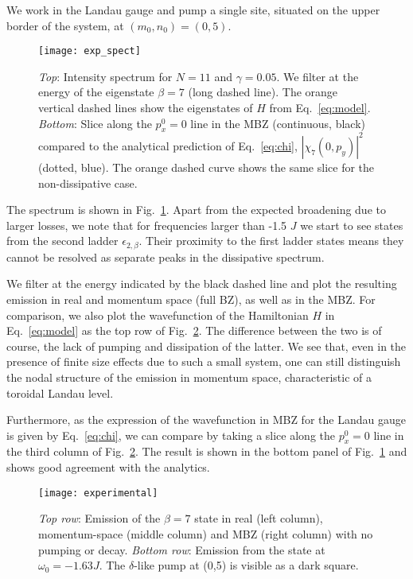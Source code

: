 \documentclass[twocolumn, 10pt, aps, superscriptaddress, floatfix, showpacs, pra, citeautoscript]{revtex4-1}
\begin{document}
 We work in the Landau gauge and pump a single site,
situated on the upper border of the system, at $(m_0,n_0)= (0,5)$.

\begin{figure}[htb]
  \centering
  \texttt{[image: exp\_spect]} %
  \caption{\emph{Top}: Intensity spectrum for $N=11$ and
    $\gamma = 0.05$. We filter at the energy of the eigenstate
    $\beta=7$ (long dashed line). The orange vertical dashed lines
    show the eigenstates of $H$ from Eq.~\eqref{eq:model}.
    \emph{Bottom}: Slice along the $p_x^0 = 0$ line in the MBZ
    (continuous, black) compared to the analytical prediction of
    Eq.~\eqref{eq:chi}, $|\chi_7(0,p_y)|^2$ (dotted, blue). The orange
    dashed curve shows the same slice for the non-dissipative case.}
  \label{fig:exp_spectrum}
\end{figure}


The spectrum is shown in Fig.~\ref{fig:exp_spectrum}. Apart from the
expected broadening due to larger losses, we note that for frequencies
larger than -1.5 $J$ we start to see states from the second ladder
$\epsilon_{2,\beta}$. Their proximity to the first ladder states means
they cannot be resolved as separate peaks in the dissipative spectrum.


We filter at the energy indicated by the black dashed line and plot
the resulting emission in real and momentum space (full BZ), as well
as in the MBZ. For comparison, we also plot the wavefunction of the
Hamiltonian $H$ in Eq.~\eqref{eq:model} as the top row of
Fig.~\ref{fig:exp_states}. The difference between the two is of
course, the lack of pumping and dissipation of the latter. We see
that, even in the presence of finite size effects due to such a small
system, one can still distinguish the nodal structure of the emission
in momentum space, characteristic of a toroidal Landau level. 

Furthermore, as the expression of the wavefunction in MBZ for the
Landau gauge is given by Eq.~\eqref{eq:chi}, we can compare by taking
a slice along the $p_x^0 = 0$ line in the third column of
Fig.~\ref{fig:exp_states}. The result is shown in the bottom panel of
Fig.~\ref{fig:exp_spectrum} and shows good agreement with the
analytics.


\begin{figure}[htb]
  \centering
  \texttt{[image: experimental]} %
  \caption{\emph{Top row}: Emission of the $\beta=7$ state in real
    (left column), momentum-space (middle column) and MBZ (right
    column) with no pumping or decay.
    \emph{Bottom row}: Emission from the state at $\omega_0 = -1.63 J$.
    The $\delta$-like pump at (0,5) is visible as a dark square.}

  \label{fig:exp_states}
\end{figure}
\end{document}
